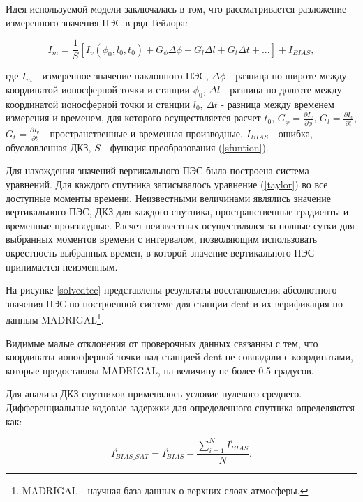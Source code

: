 \documentclass[a4paper]{article}
\begin{document}
Идея используемой модели заключалась в том, что рассматривается разложение измеренного значения ПЭС в ряд Тейлора:

\begin{equation}
I_m = \frac{1}{S} \left[ I_v(\phi_0, l_0, t_0) + G_{\phi} \Delta\phi + G_l \Delta l + G_t \Delta t + ... \right] + I_{BIAS},
\label{taylor}
\end{equation}

где $I_m$ - измеренное значение наклонного ПЭС, $\Delta\phi$ - разница по широте между координатой ионосферной точки и станции $\phi_0$, $\Delta l$ - разница по долготе между координатой ионосферной точки и станции $l_0$, $\Delta t$ - разница между временем измерения и временем, для которого осуществляется расчет $t_0$, $G_{\phi} = \frac{\partial I_v}{\partial \phi}$, $G_l = \frac{\partial I_v}{\partial l}$, $G_t = \frac{\partial I_v}{\partial t}$ - пространственные и временная производные, $I_{BIAS}$ - ошибка, обусловленная ДКЗ, $S$ - функция преобразования (\ref{sfuntion}).

Для нахождения значений вертикального ПЭС была построена система уравнений. Для каждого спутника записывалось уравнение (\ref{taylor}) во все доступные моменты времени. Неизвестными величинами являлись значение вертикального ПЭС, ДКЗ для каждого спутника, пространственные градиенты и временные производные. Расчет неизвестных осуществлялся за полные сутки для выбранных моментов времени с интервалом, позволяющим использовать окрестность выбранных времен, в которой значение вертикального ПЭС принимается неизменным.

На рисунке \ref{solvedtec} представлены результаты восстановления абсолютного значения ПЭС по построенной системе для станции dent и их верификация по данным MADRIGAL\footnote{MADRIGAL - научная база данных о верхних слоях атмосферы.}.

Видимые малые отклонения от проверочных данных связанны с тем, что координаты ионосферной точки над станцией dent не совпадали с координатами, которые предоставлял MADRIGAL, на величину не более 0.5 градусов.   


Для анализа ДКЗ спутников применялось условие нулевого среднего. Дифференциальные кодовые задержки для определенного спутника определяются как:

\begin{equation}
I_{BIAS\_SAT}^i = I_{BIAS}^i - \frac{\sum_{i=1}^{N}I_{BIAS}^i}{N}.
\end{equation}
\end{document}
